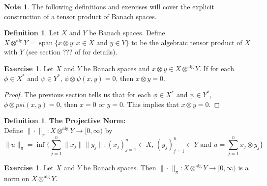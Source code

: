 \documentclass[12pt]{amsart}
\theoremstyle{definition}
\newtheorem{defn}[definition]{Definition}
\newtheorem{note}[definition]{Note}
\newtheorem{ex}[definition]{Exercise}
\newcommand{\tbf}[1]{\textbf{#1}}
\newcommand{\Rg}{[0,\infty)}
\DeclareMathOperator{\spn}{span}
\DeclareMathOperator*{\0}{\mbf{0}}
\DeclareMathOperator*{\1}{\mbf{1}}
\begin{document}
	
	\begin{note}
	The following definitions and exercises will cover the explicit construction of a tensor product of Banach spaces.
	\end{note}	
	
	\begin{defn}
	Let $X$ and $Y$ be Banach spaces. Define $X \otimes^{\text{alg}} Y = \spn \{ x \otimes y: x \in X \text{ and } y \in Y \}$ to be the algebraic tensor product of $X$ with $Y$ (see section ??? of \cite{algebra} for details). 
	\end{defn}
	
	\begin{ex}
	Let $X$ and $Y$ be Banach spaces and $x \otimes y \in X \otimes^{\text{alg}} Y$. If for each $\phi \in X^*$ and $\psi \in Y^*$, $\phi \otimes \psi(x,y) = 0$, then $x \otimes y = 0$.
	\end{ex}
	
	\begin{proof}
	The previous section tells us that for each $\phi \in X^*$ and $\psi \in Y^*$, $\phi \otimes psi(x,y) = 0$, then $x = 0$ or $y = 0$. This implies that $x \otimes y = 0$.
	\end{proof}
	
	\begin{defn}\tbf{The Projective Norm:} \\
	Define $\|\cdot \|_{\pi}:X \otimes^{\text{alg}} Y \rightarrow \Rg$ by $$\|u\|_{\pi} = \inf \bigg \{ \sum_{j=1}^n \|x_j\| \|y_j\|: (x_j)_{j=1}^n \subset X \text{, }  (y_j)_{j=1}^n \subset Y \text{ and } u = \sum_{j=1}^n x_j \otimes y_j  \bigg \}$$
	\end{defn}
	
	\begin{ex}
	Let $X$ and $Y$ be Banach spaces. Then $\| \cdot \|_{\pi}: X \otimes^{\text{alg}} Y \rightarrow \Rg$ is a norm on $X \otimes^{\text{alg}} Y$.
	\end{ex}
	
\end{document}
